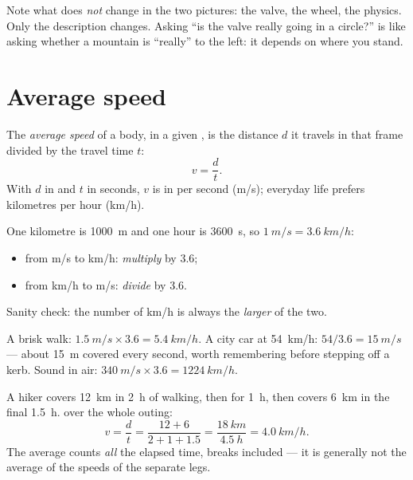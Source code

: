 \begin{remark}
Note what does \emph{not} change in the two pictures: the valve, the
wheel, the physics. Only the description changes. Asking ``is the valve
really going in a circle?'' is like asking whether a mountain is
``really'' to the left: it depends on where you stand.
\end{remark}

\section{Average speed}

\begin{definition}\label{def:g10:relative-motion:speed}
The \emph{average speed} of a body, in a given
, is the distance $d$ it travels in that frame divided by
the travel time $t$:
\[
v = \frac{d}{t} .
\]
With $d$ in  and $t$ in seconds, $v$ is in  per second
(\unit{m/s}); everyday life prefers kilometres per hour (\unit{km/h}).
\end{definition}

\begin{method}\label{met:g10:relative-motion:convert}
One kilometre is \qty{1000}{m} and one hour is \qty{3600}{s}, so
$\qty{1}{m/s} = \qty{3.6}{km/h}$:
\begin{itemize}
  \item from \unit{m/s} to \unit{km/h}: \emph{multiply} by $3.6$;
  \item from \unit{km/h} to \unit{m/s}: \emph{divide} by $3.6$.
\end{itemize}
Sanity check: the number of \unit{km/h} is always the \emph{larger} of
the two.
\end{method}

\begin{example}\label{ex:g10:relative-motion:convert}
A brisk walk: $\qty{1.5}{m/s} \times 3.6 = \qty{5.4}{km/h}$. A city car
at \qty{54}{km/h}: $54 / 3.6 = \qty{15}{m/s}$ --- about \qty{15}{m}
covered every second, worth remembering before stepping off a kerb.
Sound in air: $\qty{340}{m/s} \times 3.6 = \qty{1224}{km/h}$.
\end{example}

\begin{example}\label{ex:g10:relative-motion:hike}
A hiker covers \qty{12}{km} in \qty{2}{h} of walking, then  for
\qty{1}{h}, then covers \qty{6}{km} in the final \qty{1.5}{h}.  over the whole outing:
\[
v = \frac{d}{t} = \frac{12 + 6}{2 + 1 + 1.5}
= \frac{\qty{18}{km}}{\qty{4.5}{h}} = \qty{4.0}{km/h}.
\]
The average counts \emph{all} the elapsed time, breaks included --- it is
generally not the average of the speeds of the separate legs.
\end{example}

